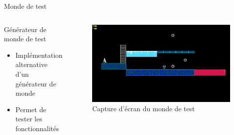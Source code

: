 \documentclass{beamer}
\begin{document}
{\begin{frame}{Monde de test}
    \begin{columns}
        \begin{block}{Générateur de monde de test}
            \begin{itemize}
                \item[\bullet] Implémentation alternative d'un générateur de monde
                \item[\bullet] Permet de tester les fonctionnalités
            \end{itemize}
        \end{block}
        \begin{figure}
            \centering
            \includegraphics[width=1.0\textwidth]{test_world}
            \caption{Capture d'écran du monde de test}
        \end{figure}
    \end{columns}
\end{frame}

}
\end{document}
